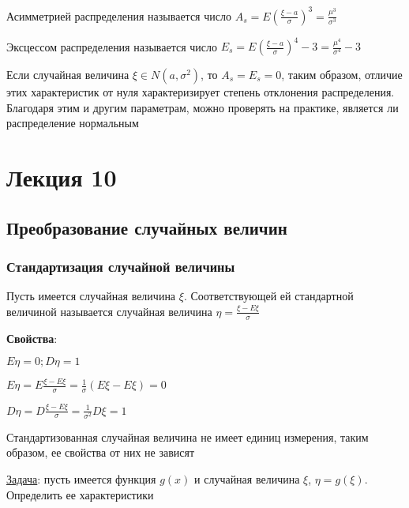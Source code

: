 \documentclass[12pt]{article}
\begin{document}
     Асимметрией распределения называется число $A_s = E\left(\frac{\xi - a}{\sigma}\right)^3 = \frac{\mu^3}{\sigma^3}$

     Эксцессом распределения называется число $E_s = E\left(\frac{\xi - a}{\sigma}\right)^4 - 3 = \frac{\mu^4}{\sigma^4} - 3$

    \Notas Если случайная величина $\xi \in N(a, \sigma^2)$, то $A_s = E_s = 0$, таким образом, отличие этих характеристик от нуля характеризирует 
    степень отклонения распределения. Благодаря этим и другим параметрам, можно проверять на практике, является ли распределение нормальным 


    \section{Лекция 10}

    \hypertarget{randomvaluetransformation}{}

    \subsection{Преобразование случайных величин}

    \hypertarget{standardizationofrandomvalue}{}

    \subsubsection{Стандартизация случайной величины}

    \Def Пусть имеется случайная величина $\xi$. Соответствующей ей стандартной величиной называется
    случайная величина $\eta = \frac{\xi - E\xi}{\sigma}$

    \textbf{Свойства}:

    $E\eta = 0; D\eta = 1$

    \begin{MyProof}
        $E\eta = E \frac{\xi - E\xi}{\sigma} = \frac{1}{\sigma} (E\xi - E\xi) = 0$

        $D\eta = D \frac{\xi - E\xi}{\sigma} = \frac{1}{\sigma^2} D\xi = 1$
    \end{MyProof}

    Стандартизованная случайная величина не имеет единиц измерения, таким образом, ее свойства от них не зависят

    \mediumvspace

    \underline{Задача}: пусть имеется функция $g(x)$ и случайная величина $\xi$, $\eta = g(\xi)$. Определить ее характеристики
\end{document}
